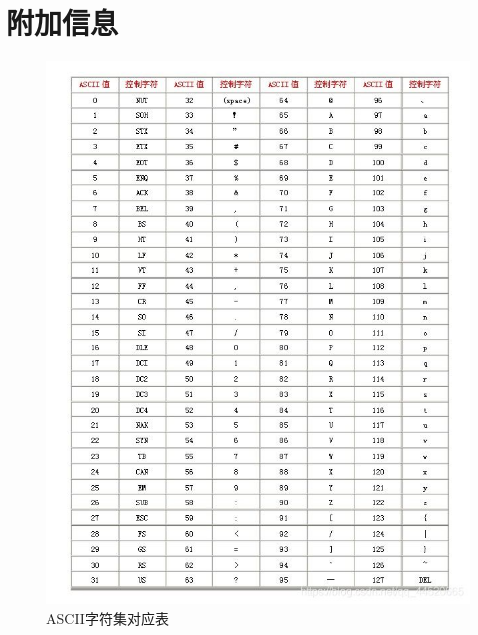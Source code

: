 \chapter{附加信息} \label{附加信息}

    \begin{figure}[htbp]
        \centering
        \includegraphics[width=0.9\linewidth]{pic/ascii.jpg}
        \caption{ASCII字符集对应表} \label{ASCII字符集对应表}
    \end{figure}

